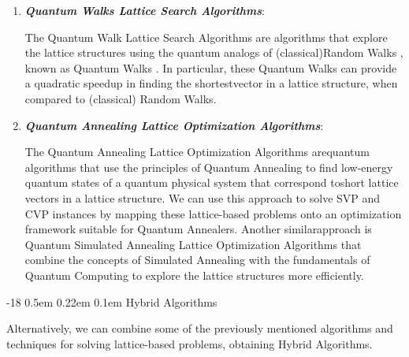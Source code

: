\documentclass[runningheads]{llncs}
\makeatletter
\renewcommand\subsubsection{\@startsection{subsubsection}{3}{\z@}%
                       {-18\p@ \@plus -4\p@ \@minus -4\p@}%
                       {0.5em \@plus 0.22em \@minus 0.1em}%
                       {\normalfont\normalsize\bfseries\boldmath}}
\numberwithin{equation}{section}
\makeatother
\begin{document}
\begin{enumerate}
        \vspace{2ex}
        \item \textbf{\textit{Quantum Walks Lattice Search Algorithms}}:
        \vspace{0.6ex}

        The Quantum Walk Lattice Search Algorithms \cite{chailloux-loyer:lattice-sieving-via-quantum-walks:2021:06-2024,bernstein-et-al:quantum-algorithms-subset-sum-problem:2013:06-2024} are algorithms that explore the lattice structures using the quantum analogs of (classical)\break Random Walks \cite{pearson:problem-random-walk:1905:06-2024}, known as Quantum Walks \cite{shenvi-kempe-whaley:quantum-random-walk-search-algorithm:2003:06-2024}. In particular, these Quantum Walks can provide a quadratic speedup in finding the shortest\break vector in a lattice structure, when compared to (classical) Random Walks.
        
        \vspace{2ex}
        \item \textbf{\textit{Quantum Annealing Lattice Optimization Algorithms}}:
        \vspace{0.6ex}

        The Quantum Annealing Lattice Optimization Algorithms \cite{joseph-et-al:two-quantum-ising-algorithms-shortest-vector-problem:2021:06-2024,raavi-et-al:security-comparisons-performance-analyses-post-quantum-signature-algorithms:2021:06-2024,yamaguchi-et-al:annealing-based-algorithm-solving-cvp-svp:2022:06-2024} are\break quantum algorithms that use the principles of Quantum Annealing to find low-energy quantum states of a quantum physical system that correspond to\break short lattice vectors in a lattice structure. We can use this approach to solve SVP and CVP instances by mapping these lattice-based problems onto an optimization framework suitable for Quantum Annealers. Another similar\break approach is Quantum Simulated Annealing Lattice Optimization Algorithms that combine the concepts of Simulated Annealing with the fundamentals of Quantum Computing to explore the lattice structures more efficiently.
        
    \end{enumerate}
    
    \subsubsection{Hybrid Algorithms}
    \label{subsubsec:hybrid-algorithms}

    Alternatively, we can combine some of the previously mentioned algorithms and techniques for solving lattice-based problems, obtaining Hybrid Algorithms.
\end{document}
